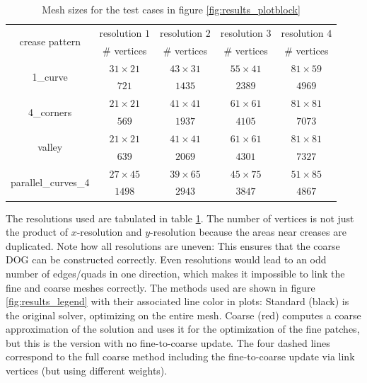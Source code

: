 \documentclass[a4paper,twoside,12pt,nochapterprefix]{scrbook}
\begin{document}
\begin{table}
\centering
\begin{tabular}{|c|c|c|c|c|}
\hline
\multirow{2}{*}{crease pattern} & resolution $1$ & resolution $2$ & resolution $3$ & resolution $4$ \\ \cline{2-5}
 & \# vertices & \# vertices & \# vertices & \# vertices \\ \hline
 
\multirow{2}{*}{1\_curve} & $31 \times 21$ & $43 \times 31$ & $55 \times 41$ & $81 \times 59$ \\ \cline{2-5}
 & $721$ & $1435$ & $2389$ & $4969$ \\ \hline
\multirow{2}{*}{4\_corners} & $21 \times 21$ & $41 \times 41$ & $61 \times 61$ & $81 \times 81$ \\ \cline{2-5}
 & $569$ & $1937$ & $4105$ & $7073$ \\ \hline
\multirow{2}{*}{valley} & $21 \times 21$ & $41 \times 41$ & $61 \times 61$ & $81 \times 81$ \\ \cline{2-5}
 & $639$ & $2069$ & $4301$ & $7327$ \\ \hline
\multirow{2}{*}{parallel\_curves\_4} & $27 \times 45$ & $39 \times 65$ & $45 \times 75$ & $51 \times 85$ \\ \cline{2-5}
 & $1498$ & $2943$ & $3847$ & $4867$ \\ \hline
\end{tabular}
\caption{Mesh sizes for the test cases in figure \ref{fig:results_plotblock}}
\label{tab:res_and_vnum}
\end{table}
The resolutions used are tabulated in table \ref{tab:res_and_vnum}. The number of vertices is not just the product of $x$-resolution and $y$-resolution because the areas near creases are duplicated. Note how all resolutions are uneven: This ensures that the coarse DOG can be constructed correctly. Even resolutions would lead to an odd number of edges/quads in one direction, which makes it impossible to link the fine and coarse meshes correctly.\newline
The methods used are shown in figure \ref{fig:results_legend} with their associated line color in plots: Standard (black) is the original solver, optimizing on the entire mesh. Coarse (red) computes a coarse approximation of the solution and uses it for the optimization of the fine patches, but this is the version with no fine-to-coarse update. The four dashed lines correspond to the full coarse method including the fine-to-coarse update via link vertices (but using different weights).\newline
\end{document}

